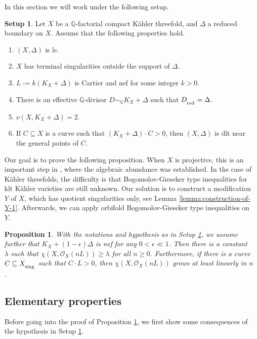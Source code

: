 \documentclass[12pt]{amsart}
\newcommand{\mbQ}{\mathbb{Q}}
\newcommand{\<}{\leq}
\def\>{\geq}
\def\subset{\subseteq}
\newcommand{\D}{\Delta}
\newtheorem{proposition}[theorem]{Proposition}
\theoremstyle{remark}
\theoremstyle{definition}
\theoremstyle{definition}
\numberwithin{equation}{section}
\theoremstyle{definition}
\theoremstyle{definition}
\newtheorem{setup}[theorem]{Setup}
\def\sing{\operatorname{\textsubscript{\rm sing}}}
\def\red{\operatorname{\textsubscript{\rm red}}}
\begin{document}
In this section we will work under the following setup.
 




\begin{setup}
\label{set:setup-1}
    Let $X$ be a  $\mathbb{Q}$-factorial compact  K\"ahler threefold, and $\Delta$ a reduced boundary on $X$. 
Assume that the following properties hold.
\begin{enumerate}
\item $(X ,\Delta )$ is lc.
\item $X$ has terminal singularities outside the support of  $\Delta$.
\item $L:=k(K_X+\Delta)$ is Cartier  and nef for some integer $k>0$.
\item There is an effective $\mbQ$-divisor $D \sim_\mathbb{Q} K_{X }+\Delta $ such that   $D_{\red}=\Delta$.
\item $\nu(X, K_X+\Delta) =2$. 
\item If $C\subset X$ is a curve such that $(K_X+\Delta)\cdot C>0$, then $(X, \Delta)$ is dlt near the general points of $C$. 
\end{enumerate}
\end{setup}



Our goal is to prove the following proposition. 
When $X$ is projective, this is an important step in \cite[Chapter 14]{Kol92}, where the algebraic abundance was established. 
In the case of K\"ahler threefolds, the difficulty is that   Bogomolov-Gieseker type inequalities for klt K\"ahler varieties are still unknown. 
Our solution is to construct a modification $Y$ of $X$, which has quotient singularities only, see Lemma \ref{lemma:construction-of-Y-1}. 
Afterwards, we can apply orbifold Bogomolov-Gieseker type inequalities on $Y$.


\begin{proposition}
\label{prop:Euler-characteristic-combined-1} 
With the notations and hypothesis as in Setup \ref{set:setup-1},  we assume further that $K_X+(1-\epsilon)\D$ is nef for any $0<\epsilon\ll 1$. 
Then there is a constant $\lambda$ such that  $\chi(X, \mathscr{O}_{{X}}(n L) ) \> \lambda$ for all $n \> 0$. 
Furthermore, if there is a curve $C\subseteq X_{\sing}$ such that $C\cdot L >0$, then $\chi(X, \mathscr{O}_{{X}}(n L) ) $ grows at least linearly in $n$.
\end{proposition}



\subsection{Elementary properties}
Before going into the proof of Proposition \ref{prop:Euler-characteristic-combined-1}, we  first show some   consequences of the hypothesis in Setup \ref{set:setup-1}.  
\end{document}
